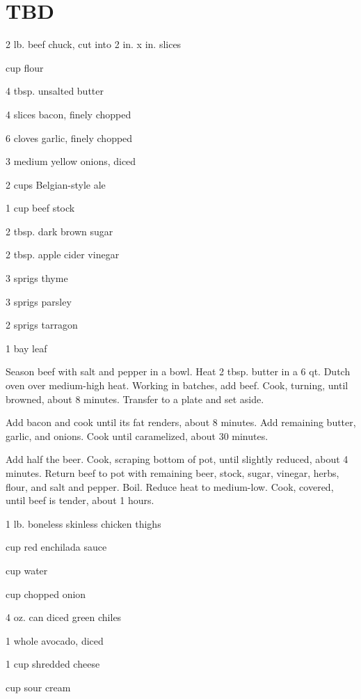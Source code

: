 \documentclass{cookbook}
\begin{document}
\tableofcontents
\section{TBD}

\begin{ingredients}
    \item 2 lb. beef chuck, cut into 2 in. x  in. slices
    \item {} cup flour
    \item 4 tbsp. unsalted butter
    \item 4 slices bacon, finely chopped
    \item 6 cloves garlic, finely chopped
    \item 3 medium yellow onions, diced
    \item 2 cups Belgian-style ale
    \item 1 cup beef stock
    \item 2 tbsp. dark brown sugar
    \item 2 tbsp. apple cider vinegar
    \item 3 sprigs thyme
    \item 3 sprigs parsley
    \item 2 sprigs tarragon
    \item 1 bay leaf
\end{ingredients}

Season beef with salt and pepper in a bowl. Heat 2 tbsp. butter in a 6 qt. Dutch oven over medium-high heat. Working in batches, add beef. Cook, turning, until browned, about 8 minutes. Transfer to a plate and set aside.

Add bacon and cook until its fat renders, about 8 minutes. Add remaining butter, garlic, and onions. Cook until caramelized, about 30 minutes.

Add half the beer. Cook, scraping bottom of pot, until slightly reduced, about 4 minutes. Return beef to pot with remaining beer, stock, sugar, vinegar, herbs, flour, and salt and pepper. Boil. Reduce heat to medium-low. Cook, covered, until beef is tender, about 1  hours.


\begin{ingredients}
    \item 1 lb. boneless skinless chicken thighs
    \item {} cup red enchilada sauce
    \item {} cup water
    \item {} cup chopped onion
    \item 4 oz. can diced green chiles
    \item 1 whole avocado, diced
    \item 1 cup shredded cheese
    \item {} cup sour cream
\end{ingredients}
\end{document}
